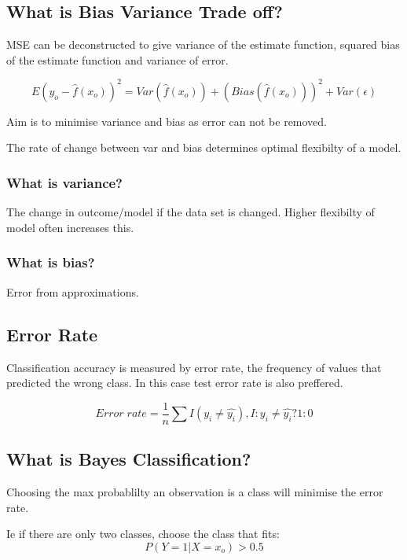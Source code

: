 \documentclass[11pt]{scrartcl} %
\begin{document}
\subsection{What is Bias Variance Trade off?}

MSE can be deconstructed to give variance of the estimate function, squared bias of the estimate function
and variance of error.

\begin{equation}
	E(y_o - \hat{f}(x_o))^2 = Var(\hat{f}(x_o)) + (Bias(\hat{f}(x_o)))^2 + Var(\epsilon)
\end{equation}

Aim is to minimise variance and bias as error can not be removed.

The rate of change between var and bias determines optimal flexibilty of a model.

\subsubsection{What is variance?}

The change in outcome/model if the data set is changed. Higher flexibilty of model often increases
this.

\subsubsection{What is bias?}

Error from approximations.

\subsection{Error Rate}

Classification accuracy is measured by error rate, the frequency of values that predicted the wrong class. In this
case test error rate is also preffered.

\begin{equation}
	Error\; rate = \frac{1}{n} \sum{I(y_i \neq \hat{y_i})} , I: y_i \neq \hat{y_i} ? 1:0
\end{equation}

\subsection{What is Bayes Classification?}

Choosing the max probablilty an observation is a class will minimise the error rate.

Ie if there are only two classes, choose the class that fits:
\begin{equation}
	P(Y=1|X=x_o) > 0.5
\end{equation}
\end{document}
